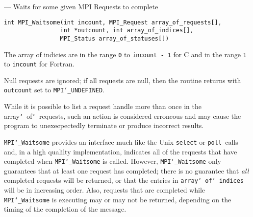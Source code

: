 \startmanpage
{}
--- Waits for some given MPI Requests to complete 
\startvb\begin{verbatim}
int MPI_Waitsome(int incount, MPI_Request array_of_requests[], 
                int *outcount, int array_of_indices[],
                MPI_Status array_of_statuses[])

\end{verbatim}
\endvb

\par
{}
\par
{}
The array of indicies are in the range {\tt 0} to {\tt incount - 1} for C and
in the range {\tt 1} to {\tt incount} for Fortran.
\par
Null requests are ignored; if all requests are null, then the routine
returns with {\tt outcount} set to {\tt MPI{\tt \char`\_}UNDEFINED}.
\par
While it is possible to list a request handle more than once in the
array{\tt \char`\_}of{\tt \char`\_}requests, such an action is considered erroneous and may cause the
program to unexecpectedly terminate or produce incorrect results.
\par
{\tt MPI{\tt \char`\_}Waitsome} provides an interface much like the Unix {\tt select} or {\tt poll
}calls and, in a high qualilty implementation, indicates all of the requests
that have completed when {\tt MPI{\tt \char`\_}Waitsome} is called.
However, {\tt MPI{\tt \char`\_}Waitsome} only guarantees that at least one
request has completed; there is no guarantee that {\em all} completed requests
will be returned, or that the entries in {\tt array{\tt \char`\_}of{\tt \char`\_}indices} will be in
increasing order. Also, requests that are completed while {\tt MPI{\tt \char`\_}Waitsome} is
executing may or may not be returned, depending on the timing of the
completion of the message.
